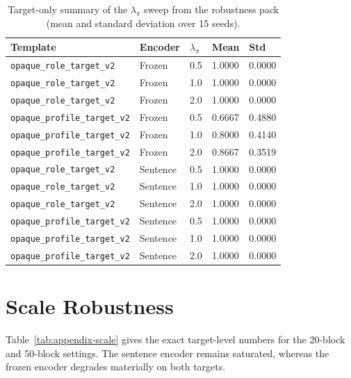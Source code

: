 \documentclass[10pt]{article}
\begin{document}
\begin{table}[h]
  \centering
  \footnotesize
\begin{tabular}{lllll}
\toprule
Template & Encoder & $\lambda_\pi$ & Mean & Std \\
\midrule
\texttt{opaque\_role\_target\_v2} & Frozen & 0.5 & 1.0000 & 0.0000 \\
\texttt{opaque\_role\_target\_v2} & Frozen & 1.0 & 1.0000 & 0.0000 \\
\texttt{opaque\_role\_target\_v2} & Frozen & 2.0 & 1.0000 & 0.0000 \\
\texttt{opaque\_profile\_target\_v2} & Frozen & 0.5 & 0.6667 & 0.4880 \\
\texttt{opaque\_profile\_target\_v2} & Frozen & 1.0 & 0.8000 & 0.4140 \\
\texttt{opaque\_profile\_target\_v2} & Frozen & 2.0 & 0.8667 & 0.3519 \\
\texttt{opaque\_role\_target\_v2} & Sentence & 0.5 & 1.0000 & 0.0000 \\
\texttt{opaque\_role\_target\_v2} & Sentence & 1.0 & 1.0000 & 0.0000 \\
\texttt{opaque\_role\_target\_v2} & Sentence & 2.0 & 1.0000 & 0.0000 \\
\texttt{opaque\_profile\_target\_v2} & Sentence & 0.5 & 1.0000 & 0.0000 \\
\texttt{opaque\_profile\_target\_v2} & Sentence & 1.0 & 1.0000 & 0.0000 \\
\texttt{opaque\_profile\_target\_v2} & Sentence & 2.0 & 1.0000 & 0.0000 \\
\bottomrule
\end{tabular}
\caption{Target-only summary of the $\lambda_\pi$ sweep from the robustness pack (mean and standard deviation over 15 seeds).}
\label{tab:appendix-lambda}
\end{table}

\section{Scale Robustness}

Table~\ref{tab:appendix-scale} gives the exact target-level numbers for the
20-block and 50-block settings. The sentence encoder remains saturated, whereas
the frozen encoder degrades materially on both targets.
\end{document}
